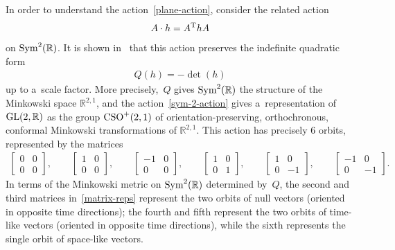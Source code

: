 \documentclass[10pt,a4paper]{amsart}
\numberwithin{equation}{section}
\theoremstyle{definition}
\begin{document}
In order to understand the action~\eqref{plane-action}, consider the related action
\begin{gather}
A\cdot h = A^{\rm T} h A
\label{sym-2-action}
\end{gather}
on ${\rm Sym}^2(\mathbb{R})$.
It is shown in~\cite[p.~115]{MH73} that this action preserves the indef\/inite quadratic form
\begin{gather}
Q(h) = -\det(h)
\label{quadratic-form}
\end{gather}
up to a~scale factor.
More precisely,~$Q$ gives ${\rm Sym}^2(\mathbb{R})$ the structure of the Minkowski space $\mathbb{R}^{2,1}$, and the
action~\eqref{sym-2-action} gives a~representation of ${\rm GL}(2,\mathbb{R})$ as the group ${\rm CSO}^+(2,1)$ of
orientation-preserving, orthochronous, conformal Minkowski transformations of $\mathbb{R}^{2,1}$.
This action has precisely 6 orbits, represented by the matrices
\begin{gather}
\label{matrix-reps}
\begin{bmatrix}
0 & 0
\\
0 & 0
\end{bmatrix},
\qquad
\begin{bmatrix}
1 & 0
\\
0 & 0
\end{bmatrix},
\qquad
\begin{bmatrix}
-1 & 0
\\
0 & 0
\end{bmatrix},
\qquad
\begin{bmatrix}
1 & 0
\\
0 & 1
\end{bmatrix},
\qquad
\begin{bmatrix}
1 & 0
\\
0 & -1
\end{bmatrix},
\qquad
\begin{bmatrix}
-1 & 0
\\
0 & -1
\end{bmatrix}.
\end{gather}
In terms of the Minkowski metric on ${\rm Sym}^2(\mathbb{R})$ determined by~$Q$, the second and third matrices
in~\eqref{matrix-reps} represent the two orbits of null vectors (oriented in opposite time directions); the fourth and
f\/ifth represent the two orbits of time-like vectors (oriented in opposite time directions), while the sixth represents
the single orbit of space-like vectors.
\end{document}
